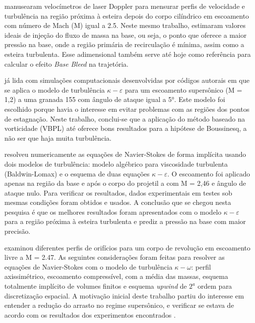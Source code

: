 \citeauthor{Mathur&Dutton1996} manusearam velocímetros de laser Doppler para mensurar perfis de velocidade e turbulência na região próxima à esteira depois do corpo cilíndrico em escoamento com número de Mach (M) igual a \num{2,5}. Neste mesmo trabalho, estimaram valores ideais de injeção do fluxo de massa na base, ou seja, o ponto que oferece a maior pressão na base, onde a região primária de recirculação é mínima, assim como a esteira turbulenta. Esse adimensional também serve até hoje como referência para calcular o efeito \textit{Base Bleed} na trajetória. 

\citeauthor{Kauri1997} já lida com simulações computacionais desenvolvidas por códigos autorais em que se aplica o modelo de turbulência \(\kappa-\varepsilon\) para um escoamento supersônico (M = 1,2) a uma granada \qty{155}{\millimetre} com ângulo de ataque igual a \ang{5}. Este modelo foi escolhido porque havia o interesse em evitar problemas com as regiões dos pontos de estagnação. Neste trabalho, conclui-se que a aplicação do método baseado na vorticidade (VBPL) até oferece bons resultados para a hipótese de Boussinesq, a não ser que haja muita turbulência. 

\citeauthor{Sahu1997} resolveu numericamente as equações de Navier-Stokes de forma implícita usando dois modelos de turbulência: modelo algébrico para viscosidade turbulenta (Baldwin-Lomax) e o esquema de duas equações \(\kappa-\varepsilon\). O escoamento foi aplicado apenas na região da base e após o corpo do projetil a com M = 2,46 e ângulo de ataque nulo. Para verificar os resultados, dados experimentais em testes sob mesmas condições foram obtidos e usados. A conclusão que se chegou nesta pesquisa é que os melhores resultados foram apresentados com o modelo \(\kappa-\varepsilon\) para a região próxima à esteira turbulenta e prediz a pressão na base com maior precisão.

\citeauthor{Lee2006Sep} examinou diferentes perfis de orifícios para um corpo de revolução em escoamento livre a M = \num{2,47}. As seguintes considerações foram feitas para resolver as equações de Navier-Stokes com o modelo de turbulência \(\kappa-\omega\): perfil axissimétrico, escoamento compressível, com a média das massas, esquema totalmente implícito de volumes finitos e esquema \textit{upwind} de $2^{a}$ ordem para discretização espacial. A motivação inicial deste trabalho partiu do interesse em entender a redução do arrasto no regime supersônico, e verificar se estava de acordo com os resultados dos experimentos encontrados \cite{Bourdon2003Feb}.

